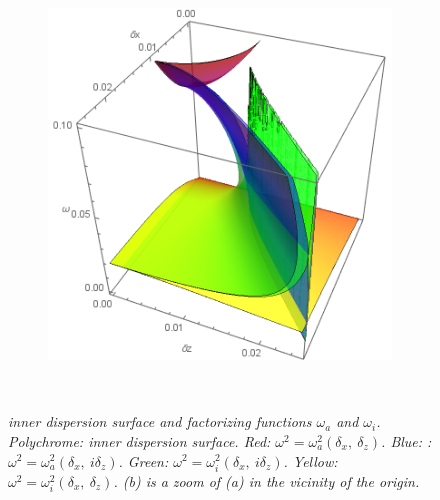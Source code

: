 \documentclass[a4paper,11pt]{article}
\begin{document}
\begin{figure}[!h]
\begin{subfigure}{0.45\linewidth}
		\includegraphics[width=1\linewidth]{FIGURES/Fig_omega_zoom.png}
		\caption{}
	\end{subfigure}
	~
	\caption{\textit{inner dispersion surface and factorizing functions $\omega_a$ and $\omega_i$. Polychrome: inner dispersion surface. Red: $\omega^2=\omega_a^2(\delta_x,\ \delta_z)$. Blue: : $\omega^2=\omega_a^2(\delta_x,\ i \delta_z)$. Green: $\omega^2=\omega_i^2(\delta_x,\ i \delta_z)$. Yellow: $\omega^2=\omega_i^2(\delta_x,\ \delta_z)$. (b) is a zoom of (a) in the vicinity of the origin.}}
	\label{FigOmega}
\end{figure}
\end{document}
